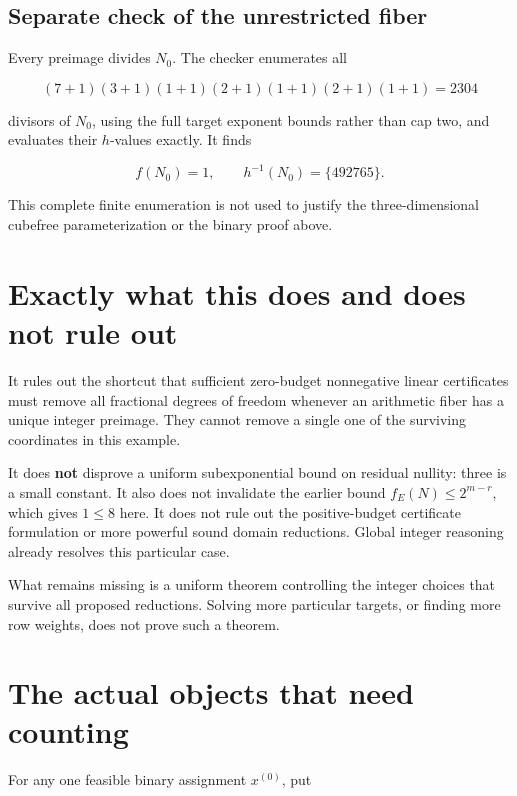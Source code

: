 \subsection{Separate check of the unrestricted fiber}\label{fractional:separate-check-of-the-unrestricted-fiber}

Every preimage divides \(N_0\). The checker enumerates all

\[
(7+1)(3+1)(1+1)(2+1)(1+1)(2+1)(1+1)=2304
\]

divisors of \(N_0\), using the full target exponent bounds rather than cap two, and evaluates their \(h\)-values exactly. It finds

\[
\boxed{f(N_0)=1,\qquad h^{-1}(N_0)=\{492765\}.}
\]

This complete finite enumeration is not used to justify the three-dimensional cubefree parameterization or the binary proof above.

\section{Exactly what this does and does not rule out}\label{fractional:exactly-what-this-does-and-does-not-rule-out}

It rules out the shortcut that sufficient zero-budget nonnegative linear certificates must remove all fractional degrees of freedom whenever an arithmetic fiber has a unique integer preimage. They cannot remove a single one of the surviving coordinates in this example.

It does \textbf{not} disprove a uniform subexponential bound on residual nullity: three is a small constant. It also does not invalidate the earlier bound \(f_E(N)\le2^{m-r}\), which gives \(1\le8\) here. It does not rule out the positive-budget certificate formulation or more powerful sound domain reductions. Global integer reasoning already resolves this particular case.

What remains missing is a uniform theorem controlling the integer choices that survive all proposed reductions. Solving more particular targets, or finding more row weights, does not prove such a theorem.

\section{The actual objects that need counting}\label{fractional:the-actual-objects-that-need-counting}

For any one feasible binary assignment \(x^{(0)}\), put

